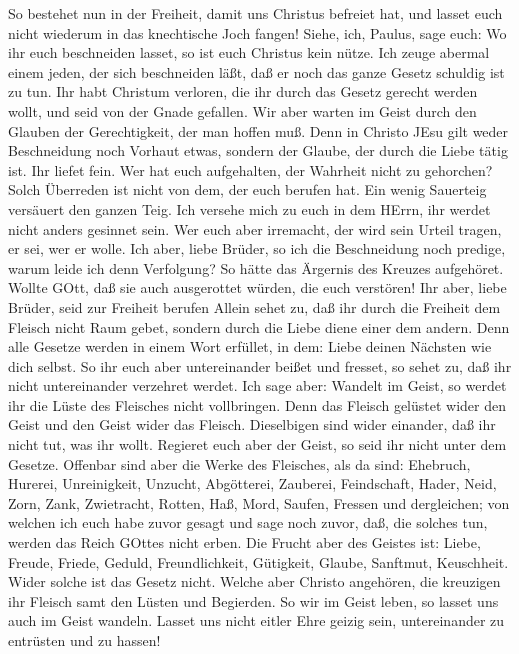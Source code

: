  So bestehet nun in der Freiheit, damit uns Christus
befreiet hat, und lasset euch nicht wiederum in das knechtische Joch
fangen!  Siehe, ich, Paulus, sage euch: Wo ihr euch
beschneiden lasset, so ist euch Christus kein nütze.  Ich
zeuge abermal einem jeden, der sich beschneiden läßt, daß er noch das
ganze Gesetz schuldig ist zu tun.  Ihr habt Christum
verloren, die ihr durch das Gesetz gerecht werden wollt, und seid von
der Gnade gefallen.  Wir aber warten im Geist durch den
Glauben der Gerechtigkeit, der man hoffen muß.  Denn in
Christo JEsu gilt weder Beschneidung noch Vorhaut etwas, sondern der
Glaube, der durch die Liebe tätig ist.  Ihr liefet fein. Wer
hat euch aufgehalten, der Wahrheit nicht zu gehorchen? 
Solch Überreden ist nicht von dem, der euch berufen hat. 
Ein wenig Sauerteig versäuert den ganzen Teig.  Ich versehe
mich zu euch in dem HErrn, ihr werdet nicht anders gesinnet sein. Wer
euch aber irremacht, der wird sein Urteil tragen, er sei, wer er wolle.
 Ich aber, liebe Brüder, so ich die Beschneidung noch
predige, warum leide ich denn Verfolgung? So hätte das Ärgernis des
Kreuzes aufgehöret.  Wollte GOtt, daß sie auch ausgerottet
würden, die euch verstören!  Ihr aber, liebe Brüder, seid
zur Freiheit berufen Allein sehet zu, daß ihr durch die Freiheit dem
Fleisch nicht Raum gebet, sondern durch die Liebe diene einer dem
andern.  Denn alle Gesetze werden in einem Wort erfüllet,
in dem: Liebe deinen Nächsten wie dich selbst.  So ihr euch
aber untereinander beißet und fresset, so sehet zu, daß ihr nicht
untereinander verzehret werdet.  Ich sage aber: Wandelt im
Geist, so werdet ihr die Lüste des Fleisches nicht vollbringen.
 Denn das Fleisch gelüstet wider den Geist und den Geist
wider das Fleisch. Dieselbigen sind wider einander, daß ihr nicht tut,
was ihr wollt.  Regieret euch aber der Geist, so seid ihr
nicht unter dem Gesetze.  Offenbar sind aber die Werke des
Fleisches, als da sind: Ehebruch, Hurerei, Unreinigkeit, Unzucht,
 Abgötterei, Zauberei, Feindschaft, Hader, Neid, Zorn,
Zank, Zwietracht, Rotten, Haß, Mord,  Saufen, Fressen und
dergleichen; von welchen ich euch habe zuvor gesagt und sage noch zuvor,
daß, die solches tun, werden das Reich GOttes nicht erben. 
Die Frucht aber des Geistes ist: Liebe, Freude, Friede, Geduld,
Freundlichkeit, Gütigkeit, Glaube, Sanftmut, Keuschheit. 
Wider solche ist das Gesetz nicht.  Welche aber Christo
angehören, die kreuzigen ihr Fleisch samt den Lüsten und Begierden.
 So wir im Geist leben, so lasset uns auch im Geist
wandeln.  Lasset uns nicht eitler Ehre geizig sein,
untereinander zu entrüsten und zu hassen!

